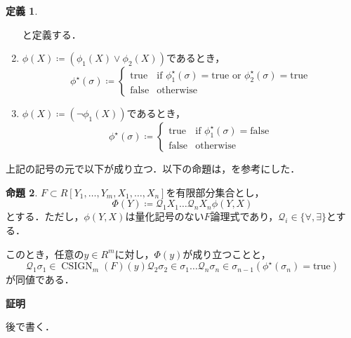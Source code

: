\documentclass[uplatex, dvipdfmx]{jsarticle}
\makeatletter
\numberwithin{equation}{section}
\renewenvironment{proof}[1][\proofname]{\par
  \pushQED{\qed}%
  \normalfont \topsep6\p@\@plus6\p@\relax
  \trivlist
  \item\relax
  {\bfseries
  #1\@addpunct{.}}\hspace\labelsep\ignorespaces
}{
  \popQED\endtrivlist\@endpefalse
}
\newcommand{\Qua}{\mathcal{Q}}
\newcommand{\true}{\text{true}}
\newcommand{\false}{\text{false}}
\DeclareMathOperator{\CSIGN}{CSIGN}
\theoremstyle{definition}
\newtheorem{definition}{定義}[section]
\newtheorem{proposition}[definition]{命題}
\renewcommand{\proofname}{\textbf{証明}}
\makeatother
\begin{document}
\begin{definition}
\begin{enumerate}
\begin{equation}
          \end{equation}
          と定義する．
          \item $\phi(X)\coloneqq (\phi_1(X) \lor \phi_2(X))$であるとき，
          \begin{equation}
               \phi^\star(\sigma)\coloneqq \begin{cases}
                    \true  & \text{if $\phi_1^\star(\sigma)=\true$ or $\phi_2^\star(\sigma)=\true$}\\
                    \false & \text{otherwise}
               \end{cases}
          \end{equation}
          \item $\phi(X)\coloneqq (\lnot \phi_1(X))$であるとき，
          \begin{equation}
               \phi^\star(\sigma)\coloneqq \begin{cases}
                    \true  & \text{if $\phi_1^\star(\sigma)=\false$}\\
                    \false & \text{otherwise}
               \end{cases}
          \end{equation}
     \end{enumerate}
\end{definition}

上記の記号の元で以下が成り立つ．以下の命題は，\cite[Proposition 11.14.]{MR2248869}を参考にした．
\begin{proposition}
     $F \subset R[Y_1, \dots, Y_m, X_1, \dots, X_n]$を有限部分集合とし，
     \begin{equation}
          \Phi(Y)\coloneqq \Qua_1 X_1 \dots \Qua_n X_n \phi(Y,X)
     \end{equation}
     とする．ただし，$\phi(Y,X)$は量化記号のない$F$論理式であり，$\Qua_i \in \{\forall, \exists\}$とする．

     このとき，任意の$y \in R^m$に対し，$\Phi(y)$が成り立つことと，
     \begin{equation}
          \Qua_1 \sigma_1 \in \CSIGN_m(F)(y) \Qua_2 \sigma_2 \in \sigma_1 \dots \Qua_n \sigma_n \in \sigma_{n-1} (\phi^\star(\sigma_n) = \true)
     \end{equation}
     が同値である．
\end{proposition}

\begin{proof}
     後で書く．
\end{proof}
\end{document}
